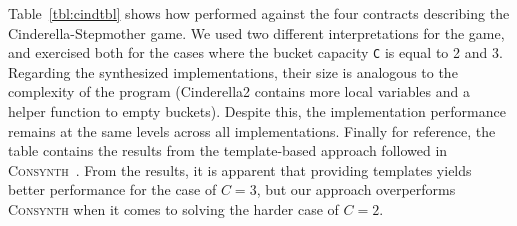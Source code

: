 \begin{table*}[!t]
\centering
\caption{Cinderella-Stepmother results}
\label{tbl:cindtbl}
\end{table*}


Table~\ref{tbl:cindtbl} shows how \jsynvg performed against the four contracts describing the Cinderella-Stepmother game. We used two different interpretations for the game, and exercised both for the cases where the bucket capacity  \texttt{C} is equal to 2 and 3. Regarding the synthesized implementations, their size is analogous to the complexity of the program (Cinderella2 contains more local variables and a helper function to empty buckets). Despite this, the implementation performance remains at the same levels across all implementations. Finally for reference, the table contains the results from the template-based approach followed in \textsc{Consynth}~\cite{beyene2014constraint}. From the results, it is apparent that providing templates yields better performance for the case of $C = 3$, but our approach overperforms \textsc{Consynth} when it comes to solving the harder case of $C = 2$. 

